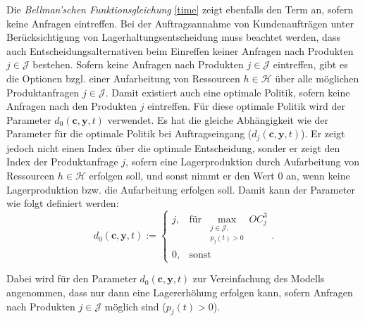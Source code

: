Die \textit{Bellman'schen Funktionsgleichung} \eqref{time} zeigt ebenfalls den Term an, sofern keine Anfragen eintreffen. Bei der Auftragsannahme von Kundenaufträgen unter Berücksichtigung von Lagerhaltungsentscheidung muss beachtet werden, dass auch Entscheidungsalternativen beim Einreffen keiner Anfragen nach Produkten $j\in\mathcal{J} $ bestehen. Sofern keine Anfragen nach Produkten $j\in\mathcal{J}$ eintreffen, gibt es die Optionen bzgl. einer Aufarbeitung von Ressourcen $h\in\mathcal{H}$ über alle möglichen Produktanfragen $j\in\mathcal{J}$. Damit existiert auch eine optimale Politik, sofern keine Anfragen nach den Produkten $j$ eintreffen. Für diese optimale Politik wird der Parameter $d_0({\textbf{c},\textbf{y},t})$ verwendet. Es hat die gleiche Abhängigkeit wie der Parameter für die optimale Politik bei Auftragseingang ($d_j({\textbf{c},\textbf{y},t})$). Er zeigt jedoch nicht einen Index über die optimale Entscheidung, sonder er zeigt den Index der Produktanfrage $j$, sofern eine Lagerproduktion durch Aufarbeitung von Ressourcen $h\in\mathcal{H}$ erfolgen soll, und sonst nimmt er den Wert $0$ an, wenn keine Lagerproduktion bzw. die Aufarbeitung erfolgen soll. Damit kann der Parameter wie folgt definiert werden:
\begin{equation}\label{GB4}
     d_{0}({\textbf{c},\textbf{y}, t}):=\left\{\begin{array}{ll}
         j, & \text{für }\max_{\substack{j\in \mathcal{J},\\ p_j(t)>0}} OC_{j}^{3}\\
         0, & \text{sonst}\end{array}\right. .
\end{equation}

Dabei wird für den Parameter $d_0({\textbf{c},\textbf{y},t})$ zur Vereinfachung des Modells angenommen, dass nur dann eine Lagererhöhung erfolgen kann, sofern Anfragen nach Produkten $j\in\mathcal J$ möglich sind ($p_j(t)>0$). 

